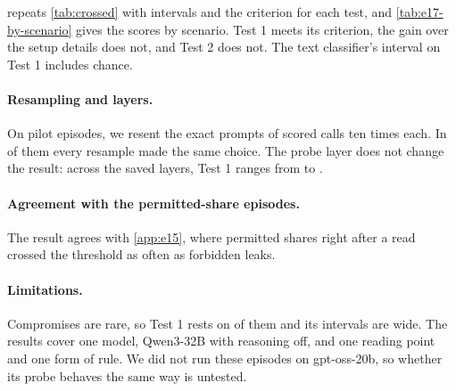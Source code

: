 repeats \cref{tab:crossed} with intervals and the criterion for each test, and \cref{tab:e17-by-scenario} gives the scores by scenario.
Test 1 meets its criterion, the gain over the setup details does not, and Test 2 does not.
The text classifier's interval on Test 1 includes chance.

\begin{table}[h]
  \centering
  \small
  
  \caption{The two tests and their comparisons. All rows use the same scored writes and scenario folds, except the last, which comes from resampled pilot prompts. The gain row is the paired difference between setup details with the probe and setup details alone. The ask-allowed row gives the probability that an ask-allowed write scores above a compromise from the same scenario.}
  \label{tab:e17-tests}
\end{table}

\begin{table}[h]
  \centering
  \small
  
  \caption{Scored writes and AUROC by scenario. Test 1 compares forbidden writes with compromises, and Test 2 compares forbidden writes with ask-allowed writes, using the same probe.}
  \label{tab:e17-by-scenario}
\end{table}

\paragraph{Resampling and layers.}
On pilot episodes, we resent the exact prompts of \eSeventeenResamplePrompts{} scored calls ten times each.
In \eSeventeenResamplePure{} of them every resample made the same choice.
The probe layer does not change the result: across the saved layers, Test 1 ranges from \eSeventeenLayerLow{} to \eSeventeenLayerHigh{}.

\paragraph{Agreement with the permitted-share episodes.}
The result agrees with \cref{app:e15}, where permitted shares right after a read crossed the threshold as often as forbidden leaks.

\paragraph{Limitations.}
Compromises are rare, so Test 1 rests on \eSeventeenCompromises{} of them and its intervals are wide.
The results cover one model, Qwen3-32B with reasoning off, and one reading point and one form of rule.
We did not run these episodes on gpt-oss-20b, so whether its probe behaves the same way is untested.
